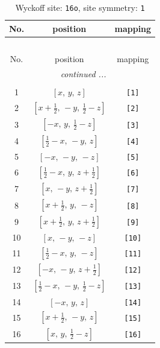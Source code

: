 \documentclass[fleqn,8pt]{jsarticle}
\begin{document}
\begin{longtable}{ccc}
\caption{Wyckoff site: {\tt 16o}, site symmetry: {\tt 1}}
 \\
 \hline \hline
No. & position & mapping \\ \hline \endfirsthead

\multicolumn{2}{l}{\tablename\ \thetable{}} \\
 \hline \hline
No. & position & mapping \\ \hline \endhead

 \hline \hline
\multicolumn{2}{r}{\footnotesize\it continued ...} \\ \endfoot

 \hline \hline
\multicolumn{2}{r}{} \\ \endlastfoot

1 & $\left[ x,\, y,\, z \right]$ & {\tt [1]} \\ \hline
2 & $\left[ x + \frac{1}{2},\, - y,\, \frac{1}{2} - z \right]$ & {\tt [2]} \\ \hline
3 & $\left[ - x,\, y,\, \frac{1}{2} - z \right]$ & {\tt [3]} \\ \hline
4 & $\left[ \frac{1}{2} - x,\, - y,\, z \right]$ & {\tt [4]} \\ \hline
5 & $\left[ - x,\, - y,\, - z \right]$ & {\tt [5]} \\ \hline
6 & $\left[ \frac{1}{2} - x,\, y,\, z + \frac{1}{2} \right]$ & {\tt [6]} \\ \hline
7 & $\left[ x,\, - y,\, z + \frac{1}{2} \right]$ & {\tt [7]} \\ \hline
8 & $\left[ x + \frac{1}{2},\, y,\, - z \right]$ & {\tt [8]} \\ \hline
9 & $\left[ x + \frac{1}{2},\, y,\, z + \frac{1}{2} \right]$ & {\tt [9]} \\ \hline
10 & $\left[ x,\, - y,\, - z \right]$ & {\tt [10]} \\ \hline
11 & $\left[ \frac{1}{2} - x,\, y,\, - z \right]$ & {\tt [11]} \\ \hline
12 & $\left[ - x,\, - y,\, z + \frac{1}{2} \right]$ & {\tt [12]} \\ \hline
13 & $\left[ \frac{1}{2} - x,\, - y,\, \frac{1}{2} - z \right]$ & {\tt [13]} \\ \hline
14 & $\left[ - x,\, y,\, z \right]$ & {\tt [14]} \\ \hline
15 & $\left[ x + \frac{1}{2},\, - y,\, z \right]$ & {\tt [15]} \\ \hline
16 & $\left[ x,\, y,\, \frac{1}{2} - z \right]$ & {\tt [16]} \\
\end{longtable}
\end{document}

